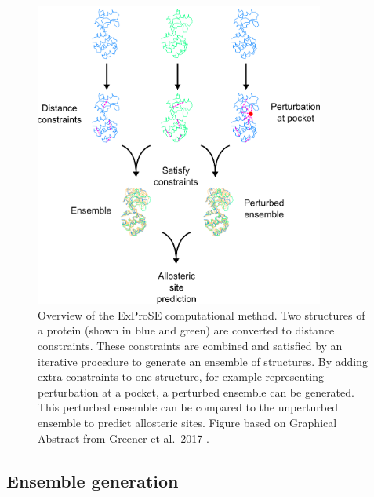\begin{figure}
\centering

\includegraphics[width=0.85\textwidth]{figures/exprose_overview/exprose_overview}

\caption[Overview of the ExProSE computational method to generate and perturb ensembles of protein structures]
{Overview of the ExProSE computational method.
Two structures of a protein (shown in blue and green) are converted to distance constraints.
These constraints are combined and satisfied by an iterative procedure to generate an ensemble of structures.
By adding extra constraints to one structure, for example representing perturbation at a pocket, a perturbed ensemble can be generated.
This perturbed ensemble can be compared to the unperturbed ensemble to predict allosteric sites.
Figure based on Graphical Abstract from Greener et al.\ 2017 \cite{Greener2017}.}

\label{fig:exprose_overview}
\end{figure}


\subsection{Ensemble generation}



